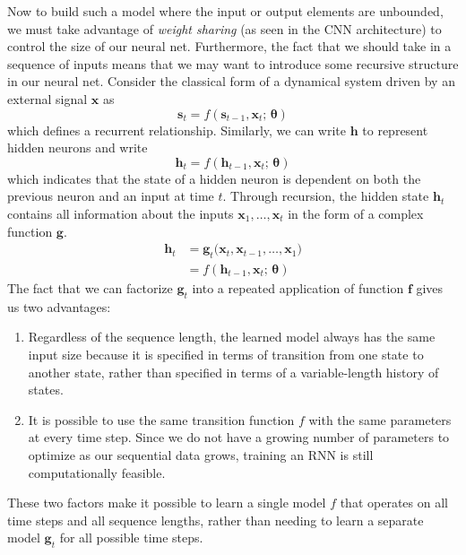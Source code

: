 \documentclass{article}
\begin{document}
  Now to build such a model where the input or output elements are unbounded, we must take advantage of \textit{weight sharing} (as seen in the CNN architecture) to control the size of our neural net. Furthermore, the fact that we should take in a sequence of inputs means that we may want to introduce some recursive structure in our neural net. Consider the classical form of a dynamical system driven by an external signal $\mathbf{x}$ as 
  \begin{equation}
    \mathbf{s}_t = f(\mathbf{s}_{t-1}, \mathbf{x}_t; \, \boldsymbol{\theta} )
  \end{equation}
  which defines a recurrent relationship. Similarly, we can write $\mathbf{h}$ to represent hidden neurons and write 
  \begin{equation}
    \mathbf{h}_t = f(\mathbf{h}_{t-1}, \mathbf{x}_t; \, \boldsymbol{\theta} )
  \end{equation}
  which indicates that the state of a hidden neuron is dependent on both the previous neuron and an input at time $t$. Through recursion, the hidden state $\mathbf{h}_t$ contains all information about the inputs $\mathbf{x}_1, \ldots, \mathbf{x}_t$ in the form of a complex function $\mathbf{g}$. 
  \begin{align}
      \mathbf{h}_t & = \mathbf{g}_t \big( \mathbf{x}_t, \mathbf{x}_{t - 1}, \ldots, \mathbf{x}_1 \big) \\
      & = f(\mathbf{h}_{t - 1}, \mathbf{x}_t; \, \boldsymbol{\theta}) 
  \end{align}
  The fact that we can factorize $\mathbf{g}_t$ into a repeated application of function $\mathbf{f}$ gives us two advantages: 
  \begin{enumerate}
      \item Regardless of the sequence length, the learned model always has the same input size because it is specified in terms of transition from one state to another state, rather than specified in terms of a variable-length history of states. 

      \item It is possible to use the same transition function $f$ with the same parameters at every time step. Since we do not have a growing number of parameters to optimize as our sequential data grows, training an RNN is still computationally feasible. 
  \end{enumerate}
  These two factors make it possible to learn a single model $f$ that operates on all time steps and all sequence lengths, rather than needing to learn a separate model $\mathbf{g}_t$ for all possible time steps. 
\end{document}
